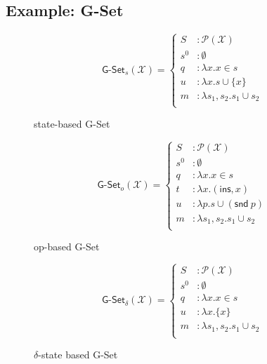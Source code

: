 \subsection{Example: G-Set}
\label{sec:example-gset}


\begin{figure}[H]
  \centering
  \[
    \textsf{G-Set}_s(\mathcal{X}) = \left\{\begin{aligned}
      S &: \mathcal{P}(\mathcal{X}) \\
      s^0 &: \emptyset \\
      q &: \lambda x. x \in s \\
      u &: \lambda x. s \cup \{ x \} \\
      m &: \lambda s_1, s_2. s_1 \cup s_2 \\
    \end{aligned}\right.
  \]
  \caption{state-based \textsf{G-Set} \CRDT}
\end{figure}

\begin{figure}[H]
  \centering
  \[
    \textsf{G-Set}_o(\mathcal{X}) = \left\{\begin{aligned}
      S &: \mathcal{P}(\mathcal{X}) \\
      s^0 &: \emptyset \\
      q &: \lambda x. x \in s \\
      t &: \lambda x. (\textsf{ins}, x) \\
      u &: \lambda p. s \cup (\textsf{snd}~p) \\
      m &: \lambda s_1, s_2. s_1 \cup s_2 \\
    \end{aligned}\right.
  \]
  \caption{op-based \textsf{G-Set} \CRDT}
\end{figure}

\begin{figure}[H]
  \centering
  \[
    \textsf{G-Set}_\delta(\mathcal{X}) = \left\{\begin{aligned}
      S &: \mathcal{P}(\mathcal{X}) \\
      s^0 &: \emptyset \\
      q &: \lambda x. x \in s \\
      u &: \lambda x. \{ x \} \\
      m &: \lambda s_1, s_2. s_1 \cup s_2 \\
    \end{aligned}\right.
  \]
  \caption{$\delta$-state based \textsf{G-Set} \CRDT}
\end{figure}

